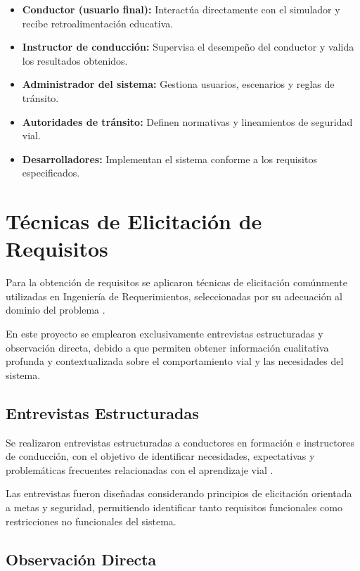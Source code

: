 \documentclass[12pt]{article}
\begin{document}
	\begin{itemize}
		\item \textbf{Conductor (usuario final):} Interactúa directamente con el simulador y recibe retroalimentación educativa.
		\item \textbf{Instructor de conducción:} Supervisa el desempeño del conductor y valida los resultados obtenidos.
		\item \textbf{Administrador del sistema:} Gestiona usuarios, escenarios y reglas de tránsito.
		\item \textbf{Autoridades de tránsito:} Definen normativas y lineamientos de seguridad vial.
		\item \textbf{Desarrolladores:} Implementan el sistema conforme a los requisitos especificados.
	\end{itemize}
	
	\section{Técnicas de Elicitación de Requisitos}
	
	Para la obtención de requisitos se aplicaron técnicas de elicitación comúnmente utilizadas en Ingeniería de Requerimientos, seleccionadas por su adecuación al dominio del problema \cite{Wiegers2013}.
	
	En este proyecto se emplearon exclusivamente entrevistas estructuradas y observación directa, debido a que permiten obtener información cualitativa profunda y contextualizada sobre el comportamiento vial y las necesidades del sistema.
	
	\subsection{Entrevistas Estructuradas}
	
	Se realizaron entrevistas estructuradas a conductores en formación e instructores de conducción, con el objetivo de identificar necesidades, expectativas y problemáticas frecuentes relacionadas con el aprendizaje vial \cite{Wiegers2013,Levaniuk202549}.
	
	Las entrevistas fueron diseñadas considerando principios de elicitación orientada a metas y seguridad, permitiendo identificar tanto requisitos funcionales como restricciones no funcionales del sistema.
	
	\subsection{Observación Directa}
	
\end{document}
